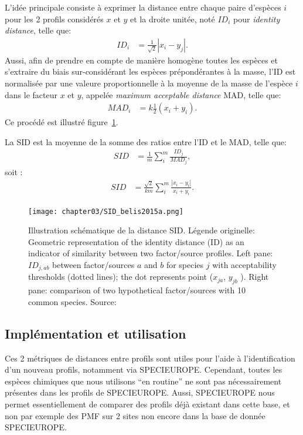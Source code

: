L'idée principale consiste à exprimer la distance entre chaque paire d'espèces $i$ pour les 2
profils considérés $x$ et $y$ et la droite unitée, noté $ID_i$ pour \textit{identity
distance}, telle que:
\begin{align}
    \label{eq:IDi}
    ID_i &= \frac{1}{\sqrt{2}}|x_i - y_j|.
\end{align}
Aussi, afin de prendre en compte de manière homogène toutes les espèces et s'extraire du
biais sur-considérant les espèces prépondérantes à la masse, l'ID est normalisée par une
valeure proportionnelle à la moyenne de la masse de l'espèce $i$ dans le facteur $x$ et
$y$, appelée \textit{maximum acceptable distance} MAD, telle que:
\begin{align}
    \label{eq:MAD}
    MAD_i &= k \frac{1}{2}(x_i + y_i).
\end{align}
Ce procédé est illustré figure~\ref{fig:chapter03/SID_belis2015a}.

La SID est la moyenne de la somme des ratios entre l'ID et le MAD, telle que:
\begin{align}
    \label{eq:SIDi}
    SID &= \frac{1}{m}\sum_i^m\frac{ID_j}{MAD_j},
\end{align}
soit :
\begin{align}
    \label{eq:SID}
    SID &= \frac{\sqrt{2}}{km} \sum_i^m \frac{|x_i - y_i|}{x_i + y_i}.
\end{align}

\begin{figure}[ht]
    \centering
    \texttt{[image: chapter03/SID\_belis2015a.png]}
    \caption{Illustration schématique de la distance SID. Légende originelle:
        Geometric representation of the identity distance (ID) as an indicator of
        similarity between two factor/source profiles. Left pane: $ID_{j,ab}$ between
        factor/sources $a$ and $b$ for species $j$ with acceptability thresholds (dotted lines);
        the dot represents point ($x_{ja}$, $y_{jb}$ ). Right pane: comparison of two
        hypothetical factor/sources with 10 common species.
        Source: \cite[figure 2]{belisNew2015}
}%
    \label{fig:chapter03/SID_belis2015a}
\end{figure}

\subsection{Implémentation et utilisation}%
\label{sub:implémentation_et_utilisation}

Ces 2 métriques de distances entre profils sont utiles pour l'aide à l'identification
d'un nouveau profils, notamment via SPECIEUROPE. Cependant, toutes les espèces chimiques
que nous utilisons ``en routine'' ne sont pas nécessairement présentes dans les profils de
SPECIEUROPE. Aussi, SPECIEUROPE nous permet essentiellement de comparer des profils déjà
existant dans cette base, et non
par exemple des PMF sur 2 sites non encore dans la base de donnée SPECIEUROPE.

